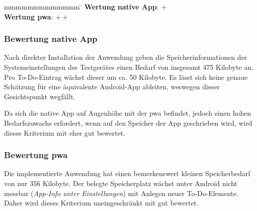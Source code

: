 \begin{tabbing}
	mmmmmmmmmmmmm				\= \kill
	\textbf{Wertung native App}: \> $+$\\
	\textbf{Wertung \ac{pwa}}: \> $++$
\end{tabbing}

\subsubsection{Bewertung native App}
Nach direkter Installation der Anwendung geben die Speicherinformationen der Systemeinstellungen des Testgerätes einen Bedarf von insgesamt 475 Kilobyte an. Pro To-Do-Eintrag wächst dieser um ca. 50 Kilobyte. Es lässt sich keine genaue Schätzung für eine äquivalente Android-App ableiten, weswegen dieser Gesichtspunkt wegfällt.

Da sich die native App auf Augenhöhe mit der \ac{pwa} befindet, jedoch einen hohen Bedarfszuwachs erfordert, wenn auf den Speicher der App geschrieben wird, wird dieses Kriterium mit eher gut bewertet.

\subsubsection{Bewertung \ac{pwa}}
Die implementierte Anwendung hat einen bemerkenswert kleinen Speicherbedarf von nur 356 Kilobyte. Der belegte Speicherplatz wächst unter Android nicht messbar (\textit{App-Info unter Einstellungen}) mit Anlegen neuer To-Do-Elemente. Daher wird dieses Kriterium uneingeschränkt mit gut bewertet.